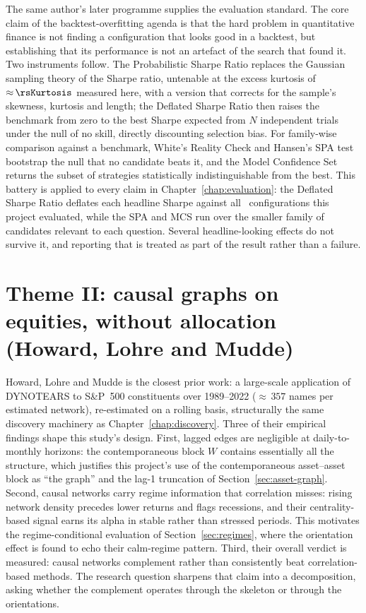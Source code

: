 The same author's later programme supplies the evaluation standard. The core
claim of the backtest-overfitting agenda \cite{bailey2014deflated,
lopezdeprado2023causal} is that the hard problem in quantitative finance is
not finding a configuration that looks good in a backtest, but establishing
that its performance is not an artefact of the search that found it. Two
instruments follow. The Probabilistic Sharpe Ratio \cite{bailey2012psr}
replaces the Gaussian sampling theory of the Sharpe ratio, untenable at the
excess kurtosis of ${\approx}\,\rsKurtosis$ measured here, with a version
that corrects for the sample's skewness, kurtosis and length; the
Deflated Sharpe Ratio \cite{bailey2014deflated} then raises the
benchmark from zero to the best Sharpe expected from $N$ independent trials
under the null of no skill, directly discounting selection bias. For
family-wise comparison against a benchmark, White's Reality Check
\cite{white2000reality} and Hansen's SPA test \cite{hansen2005spa} bootstrap
the null that no candidate beats it, and the Model Confidence Set
\cite{hansen2011mcs} returns the subset of strategies statistically
indistinguishable from the best. This battery is applied to every claim in
Chapter~\ref{chap:evaluation}: the Deflated Sharpe Ratio deflates each
headline Sharpe against all \rsNtrials\ configurations this project
evaluated, while the SPA and MCS run over the smaller family
of candidates relevant to each question. Several headline-looking effects do
not survive it, and reporting that is treated as part of the result rather
than a failure.

\section{Theme II: causal graphs on equities, without allocation
(Howard, Lohre and Mudde)}
\label{sec:howard-theme}

Howard, Lohre and Mudde \cite{howard2025causal} is the closest prior work: a
large-scale application of DYNOTEARS to S\&P~500 constituents over
1989--2022 (${\approx}\,357$ names per estimated network), re-estimated on
a rolling basis, structurally the same discovery machinery as
Chapter~\ref{chap:discovery}. Three of their empirical findings shape this
study's design. First, lagged edges are negligible at daily-to-monthly
horizons: the contemporaneous block $W$ contains essentially all the
structure, which justifies this project's use of the contemporaneous
asset--asset block as ``the graph'' and the lag-1 truncation of
Section~\ref{sec:asset-graph}.
Second, causal networks carry regime information that correlation
misses: rising network density precedes lower returns and flags recessions,
and their centrality-based signal earns its alpha in stable rather than
stressed periods. This motivates the regime-conditional evaluation of
Section~\ref{sec:regimes}, where the orientation effect is found to echo
their calm-regime pattern. Third, their overall verdict is measured:
causal networks complement rather than consistently beat correlation-based
methods. The research question sharpens that claim into a decomposition, asking whether the
complement operates through the skeleton or through the orientations.

